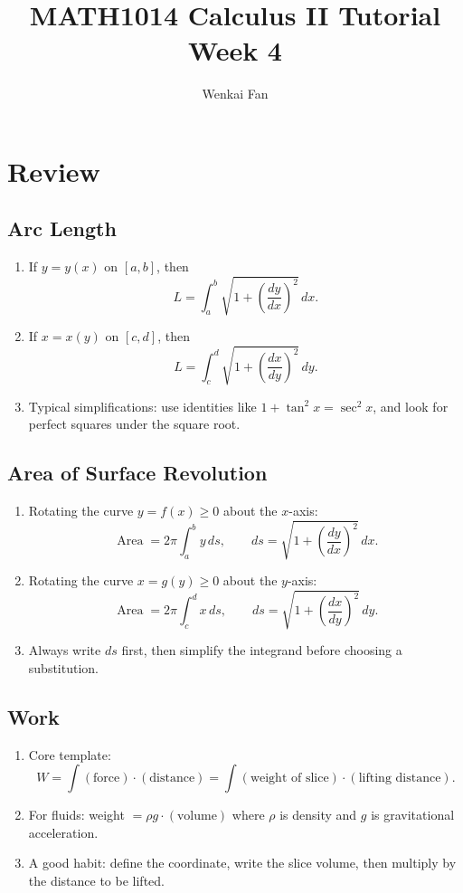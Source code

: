 \documentclass[11pt]{article}
\title{\vspace{-1.0em}MATH1014 Calculus II Tutorial\\Week 4}
\author{Wenkai Fan}
\date{}
\theoremstyle{definition}
\theoremstyle{remark}
\DeclareMathOperator{\Area}{Area}
\begin{document}
\maketitle
\thispagestyle{fancy}

\section{Review}

\subsection{Arc Length}
\begin{enumerate}
  \item If $y=y(x)$ on $[a,b]$, then
  \[
  L=\int_a^b \sqrt{1+\left(\frac{dy}{dx}\right)^2}\,dx.
  \]
  \item If $x=x(y)$ on $[c,d]$, then
  \[
  L=\int_c^d \sqrt{1+\left(\frac{dx}{dy}\right)^2}\,dy.
  \]
  \item Typical simplifications: use identities like $1+\tan^2 x=\sec^2 x$, and look for perfect squares under the square root.
\end{enumerate}

\subsection{Area of Surface Revolution}
\begin{enumerate}
  \item Rotating the curve $y=f(x)\ge 0$ about the $x$-axis:
  \[
  \Area=2\pi\int_a^b y\,ds,\qquad ds=\sqrt{1+\left(\frac{dy}{dx}\right)^2}\,dx.
  \]
  \item Rotating the curve $x=g(y)\ge 0$ about the $y$-axis:
  \[
  \Area=2\pi\int_c^d x\,ds,\qquad ds=\sqrt{1+\left(\frac{dx}{dy}\right)^2}\,dy.
  \]
  \item Always write $ds$ first, then simplify the integrand before choosing a substitution.
\end{enumerate}

\subsection{Work}
\begin{enumerate}
  \item Core template:
  \[
  W=\int (\text{force})\cdot(\text{distance})=\int (\text{weight of slice})\cdot(\text{lifting distance}).
  \]
  \item For fluids: weight $=\rho g\cdot(\text{volume})$ where $\rho$ is density and $g$ is gravitational acceleration.
  \item A good habit: define the coordinate, write the slice volume, then multiply by the distance to be lifted.
\end{enumerate}
\end{document}

